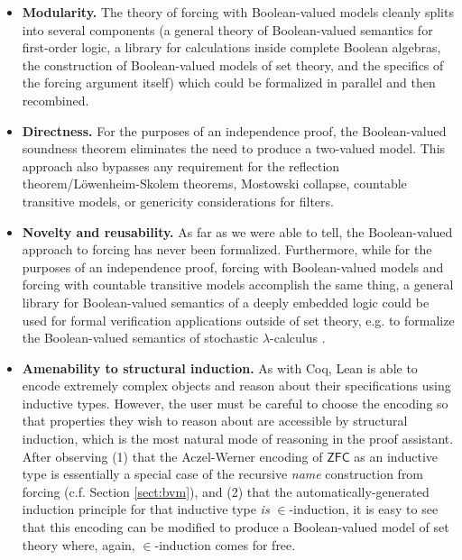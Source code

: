 \documentclass[a4paper,USenglish,cleveref, autoref]{lipics-v2019}
\theoremstyle{theorem}
\theoremstyle{definition}
\begin{document}
\begin{itemize}
\item \textbf{Modularity.} The theory of forcing with Boolean-valued models cleanly splits into several components (a general theory of Boolean-valued semantics for first-order logic, a library for calculations inside complete Boolean algebras, the construction of Boolean-valued models of set theory, and the specifics of the forcing argument itself) which could be formalized in parallel and then recombined.

\item \textbf{Directness.} For the purposes of an independence proof, the Boolean-valued soundness theorem eliminates the need to produce a two-valued model. This approach also bypasses any requirement for the reflection theorem/L\"owenheim-Skolem theorems, Mostowski collapse, countable transitive models, or genericity considerations for filters.

\item \textbf{Novelty and reusability.} As far as we were able to tell, the Boolean-valued approach to forcing has never been formalized. Furthermore, while for the purposes of an independence proof, forcing with Boolean-valued models and forcing with countable transitive models accomplish the same thing, a general library for Boolean-valued semantics of a deeply embedded logic could be used for formal verification applications outside of set theory, e.g. to formalize the Boolean-valued semantics of stochastic $\lambda$-calculus \cite{scott2014stochastic, bacci2018boolean}.

  \item \textbf{Amenability to structural induction.} As with Coq, Lean is able to encode extremely complex objects and reason about their specifications using inductive types. However, the user must be careful to choose the encoding so that properties they wish to reason about are accessible by structural induction, which is the most natural mode of reasoning in the proof assistant. After observing (1) that the Aczel-Werner encoding of $\mathsf{ZFC}$ as an inductive type is essentially a special case of the recursive \emph{name} construction from forcing (c.f. Section \ref{sect:bvm}), and (2) that the automatically-generated induction principle for that inductive type \emph{is} $\in$-induction, it is easy to see that this encoding can be modified to produce a Boolean-valued model of set theory where, again, $\in$-induction comes for free.
\end{itemize}
\end{document}
